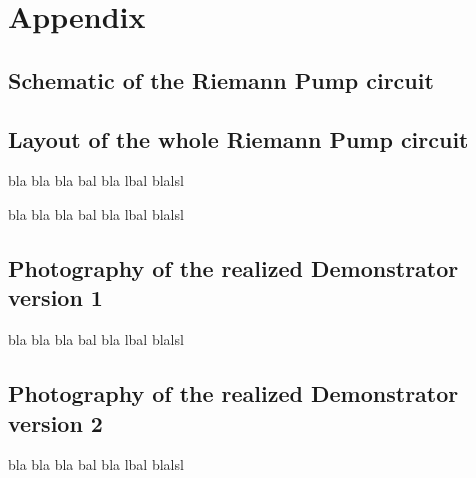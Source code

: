 \renewcommand*\thechapter{}
\renewcommand*\thesection{\Alph{section}}
\chapter*{Appendix}

\section{Schematic of the Riemann Pump circuit}
%

\newpage
\section{Layout of the whole Riemann Pump circuit}

bla bla bla bal bla lbal blalsl

bla bla bla bal bla lbal blalsl

\newpage
\section{Photography of the realized Demonstrator version 1}

bla bla bla bal bla lbal blalsl
\section{Photography of the realized Demonstrator version 2}

bla bla bla bal bla lbal blalsl